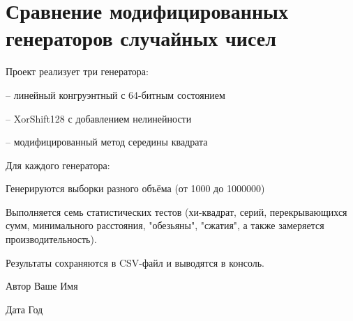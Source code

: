 \chapter{Сравнение модифицированных генераторов случайных чисел }
\hypertarget{index}{}\label{index}
Проект реализует три генератора:\+
\begin{DoxyItemize}
\item {} – линейный конгруэнтный с 64-\/битным состоянием
\item {} – Xor\+Shift128 с добавлением нелинейности
\item {} – модифицированный метод середины квадрата
\end{DoxyItemize}

Для каждого генератора:\+
\begin{DoxyItemize}
\item Генерируются выборки разного объёма (от 1000 до 1000000)
\item Выполняется семь статистических тестов (хи-\/квадрат, серий, перекрывающихся сумм, минимального расстояния, "{}обезьяны"{}, "{}сжатия"{}, а также замеряется производительность).
\item Результаты сохраняются в CSV-\/файл и выводятся в консоль.
\end{DoxyItemize}

\begin{DoxyAuthor}{Автор}
Ваше Имя 
\end{DoxyAuthor}
\begin{DoxyDate}{Дата}
Год 
\end{DoxyDate}
